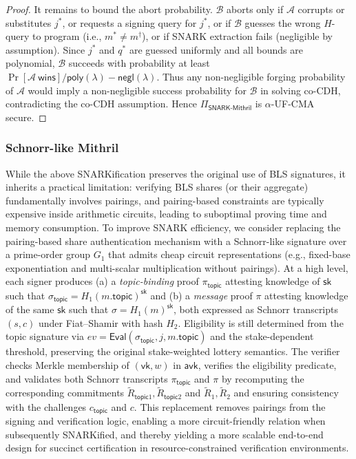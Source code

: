 \documentclass{article}
\newcommand{\sk}[0]{\mathsf{sk}}
\newcommand{\vk}[0]{\mathsf{vk}}
\newcommand{\avk}[0]{\mathsf{avk}}
\newcommand{\topic}[0]{\mathsf{topic}}
\newcommand{\negl}{\mathsf{negl}}
\begin{document}
\begin{proof}
It remains to bound the abort probability. $\mathcal{B}$ aborts only if $\mathcal{A}$ corrupts or substitutes $j^\ast$, or requests a signing query for $j^\ast$, or if $\mathcal{B}$ guesses the wrong $H$-query to program (i.e., $m^\ast\neq m^\dagger$), or if SNARK extraction fails (negligible by assumption). Since $j^\ast$ and $q^\ast$ are guessed uniformly and all bounds are polynomial, $\mathcal{B}$ succeeds with probability at least $\Pr[\mathcal{A}\ \mathsf{wins}]/\mathsf{poly}(\lambda)-\negl(\lambda)$. Thus any non-negligible forging probability of $\mathcal{A}$ would imply a non-negligible success probability for $\mathcal{B}$ in solving co-\textsf{CDH}, contradicting the co-\textsf{CDH} assumption. Hence $\Pi_{\mathsf{SNARK\text{-}Mithril}}$ is $\alpha$-\textsf{UF-CMA} secure.
\end{proof}


\subsubsection{Schnorr-like Mithril}

While the above SNARKification preserves the original use of BLS signatures, it inherits a practical limitation: verifying BLS shares (or their aggregate) fundamentally involves pairings, and pairing-based constraints are typically expensive inside arithmetic circuits, leading to suboptimal proving time and memory consumption.
To improve SNARK efficiency, we consider replacing the pairing-based share authentication mechanism with a Schnorr-like signature over a prime-order group $G_1$ that admits cheap circuit representations (e.g., fixed-base exponentiation and multi-scalar multiplication without pairings).
At a high level, each signer produces (a) a \emph{topic-binding} proof $\pi_{\topic}$ attesting knowledge of $\sk$ such that $\sigma_{\topic}=H_1(m.\topic)^{\sk}$ and (b) a \emph{message} proof $\pi$ attesting knowledge of the same $\sk$ such that $\sigma=H_1(m)^{\sk}$, both expressed as Schnorr transcripts $(s,c)$ under Fiat--Shamir with hash $H_2$.
Eligibility is still determined from the topic signature via $ev=\mathsf{Eval}(\sigma_{\topic},j,m.\topic)$ and the stake-dependent threshold, preserving the original stake-weighted lottery semantics.
The verifier checks Merkle membership of $(\vk,w)$ in $\avk$, verifies the eligibility predicate, and validates both Schnorr transcripts $\pi_{\topic}$ and $\pi$ by recomputing the corresponding commitments $\widetilde{R}_{\topic1},\widetilde{R}_{\topic2}$ and $\widetilde{R}_1,\widetilde{R}_2$ and ensuring consistency with the challenges $c_{\topic}$ and $c$.
This replacement removes pairings from the signing and verification logic, enabling a more circuit-friendly relation when subsequently SNARKified, and thereby yielding a more scalable end-to-end design for succinct certification in resource-constrained verification environments.
\end{document}
